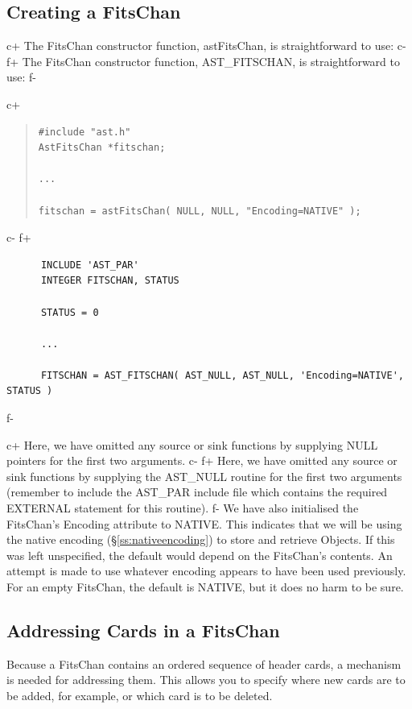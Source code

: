 \documentclass[twoside,11pt]{article}
\newcommand{\secref}[1]{\S\ref{#1}}
\newcommand{\secref}[1]{\ref{#1}}
\begin{document}
\subsection{\label{ss:creatingafitschan}Creating a FitsChan}

c+
The FitsChan constructor function, astFitsChan, is straightforward to
use:
c-
f+
The FitsChan constructor function, AST\_FITSCHAN, is straightforward
to use:
f-

c+
\begin{quote}
\small
\begin{verbatim}
#include "ast.h"
AstFitsChan *fitschan;

...

fitschan = astFitsChan( NULL, NULL, "Encoding=NATIVE" );
\end{verbatim}
\normalsize
\end{quote}
c-
f+
\small
\begin{verbatim}
      INCLUDE 'AST_PAR'
      INTEGER FITSCHAN, STATUS

      STATUS = 0

      ...

      FITSCHAN = AST_FITSCHAN( AST_NULL, AST_NULL, 'Encoding=NATIVE', STATUS )
\end{verbatim}
\normalsize
f-

c+
Here, we have omitted any source or sink functions by supplying NULL
pointers for the first two arguments.
c-
f+
Here, we have omitted any source or sink functions by supplying the
AST\_NULL routine for the first two arguments (remember to include the
AST\_PAR include file which contains the required EXTERNAL statement
for this routine).
f-
We have also initialised the FitsChan's Encoding attribute to
NATIVE. This indicates that we will be using the native encoding
(\secref{ss:nativeencoding}) to store and retrieve Objects. If this
was left unspecified, the default would depend on the FitsChan's
contents. An attempt is made to use whatever encoding appears to have
been used previously. For an empty FitsChan, the default is NATIVE,
but it does no harm to be sure.

\subsection{\label{ss:addressingfitscards}Addressing Cards in a FitsChan}

Because a FitsChan contains an ordered sequence of header cards, a
mechanism is needed for addressing them. This allows you to specify
where new cards are to be added, for example, or which card is to be
deleted.
\end{document}
